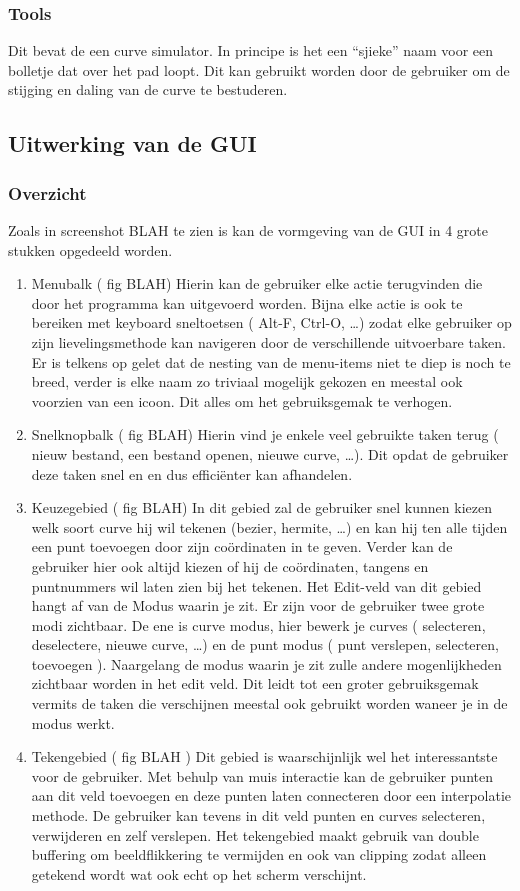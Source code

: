 \documentclass[a4paper,11pt,oneside, titlepage]{article}
\begin{document}
\subsubsection{Tools}
Dit bevat de een curve simulator. In principe is het een ``sjieke'' naam voor een bolletje
dat over het pad loopt. Dit kan gebruikt worden door de gebruiker om de stijging en daling
van de curve te bestuderen.
\subsection{Uitwerking van de GUI}
\subsubsection{Overzicht}

Zoals in screenshot BLAH te zien is kan de vormgeving van de GUI in 4 grote stukken opgedeeld 
worden.
\begin{enumerate}
\item Menubalk ( fig BLAH)
Hierin kan de gebruiker elke actie terugvinden die door het programma kan uitgevoerd worden.
Bijna elke actie is ook te bereiken met keyboard sneltoetsen ( Alt-F, Ctrl-O, \ldots ) zodat
elke gebruiker op zijn lievelingsmethode kan navigeren door de verschillende uitvoerbare taken.
Er is telkens op gelet dat de nesting van de menu-items niet te diep is noch te breed, verder
is elke naam zo triviaal mogelijk gekozen en meestal ook voorzien van een icoon. Dit alles
om het gebruiksgemak te verhogen.
\item Snelknopbalk ( fig BLAH)
Hierin vind je enkele veel gebruikte taken terug ( nieuw bestand, een bestand openen, 
nieuwe curve, \ldots ). Dit opdat de gebruiker deze taken snel en en dus effici\"enter kan
afhandelen.
\item Keuzegebied ( fig BLAH)
In dit gebied zal de gebruiker snel kunnen kiezen welk soort curve hij wil tekenen (bezier, 
hermite, \ldots ) en kan hij ten alle tijden een punt toevoegen door zijn co\"ordinaten in te
geven. Verder kan de gebruiker hier ook altijd kiezen of hij de co\"ordinaten, tangens en 
puntnummers wil laten zien bij het tekenen. \newline
Het Edit-veld van dit gebied hangt af van de Modus waarin je zit. Er zijn voor de gebruiker
twee grote modi zichtbaar. De ene is curve modus, hier bewerk je curves ( selecteren, 
deselectere, nieuwe curve, \ldots ) en de punt modus ( punt verslepen, selecteren, toevoegen ).
Naargelang de modus waarin je zit zulle andere mogenlijkheden zichtbaar worden in het edit veld.
Dit leidt tot een groter gebruiksgemak vermits de taken die verschijnen meestal ook gebruikt
worden waneer je in de modus werkt.
\item Tekengebied ( fig BLAH )
Dit gebied is waarschijnlijk wel het interessantste voor de gebruiker. Met behulp van muis
interactie kan de gebruiker punten aan dit veld toevoegen en deze punten laten connecteren
door een interpolatie methode. De gebruiker kan tevens in dit veld punten en curves selecteren,
verwijderen en zelf verslepen. Het tekengebied maakt gebruik van double buffering om 
beeldflikkering te vermijden en ook van clipping zodat alleen getekend wordt wat ook echt
op het scherm verschijnt.
\end{enumerate}
\end{document}
